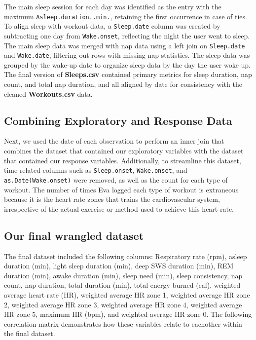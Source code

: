 \documentclass{article}
\begin{document}
The main sleep session for each day was identified as the entry with the maximum \texttt{Asleep.duration..min.}, retaining the first occurrence in case of ties. To align sleep with workout data, a \texttt{Sleep.date} column was created by subtracting one day from \texttt{Wake.onset}, reflecting the night the user went to sleep. The main sleep data was merged with nap data using a left join on \texttt{Sleep.date} and \texttt{Wake.date}, filtering out rows with missing nap statistics. The sleep data was grouped by the wake-up date to organize sleep data by the day the user woke up. The final version of \textbf{Sleeps.csv} contained primary metrics for sleep duration, nap count, and total nap duration, and all aligned by date for consistency with the cleaned \textbf{Workouts.csv} data. 

\subsection{\small {Combining Exploratory and Response Data}}

Next, we used the date of each observation to perform an inner join that combines the dataset that contained our exploratory variables with the dataset that contained our response variables. Additionally, to streamline this dataset, time-related columns such as \verb|Sleep.onset|, \verb|Wake.onset|, and \verb|as.Date(Wake.onset)| were removed, as well as the count for each type of workout. The number of times Eva logged each type of workout is extraneous because it is the heart rate zones that trains the cardiovascular system, irrespective of the actual exercise or method used to achieve this heart rate. 

\subsection{\small{Our final wrangled dataset}}

The final dataset included the following columns: Respiratory rate (rpm), asleep duration (min), light sleep duration (min), deep SWS duration (min), REM duration (min), awake duration (min), sleep need (min), sleep consistency, nap count, nap duration, total duration (min), total energy burned (cal), weighted average heart rate (HR), weighted average HR zone 1, weighted average HR zone 2, weighted average HR zone 3, weighted average HR zone 4, weighted average HR zone 5, maximum HR (bpm), and weighted average HR zone 0. The following correlation matrix demonstrates how these variables relate to eachother within the final dataset. \\
\end{document}
